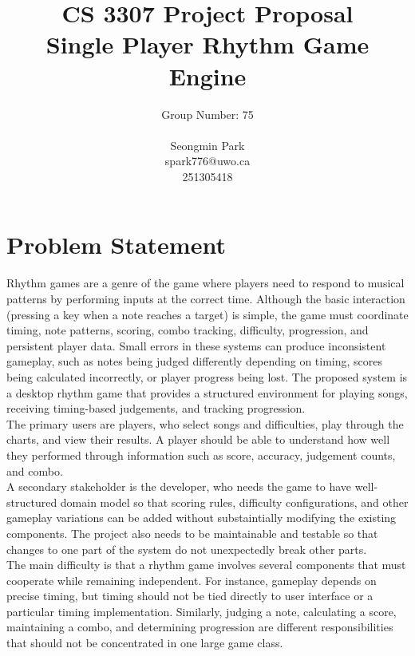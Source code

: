 \documentclass[12pt,a4paper]{article}
\title{
    CS 3307 Project Proposal \\ 
    \large Single Player Rhythm Game Engine
}
\author{
    Group Number: 75 \\
    \\
    Seongmin Park \\
    spark776@uwo.ca \\
    251305418
}
\date{}
\newcommand\tab[1][1cm]{\hspace*{#1}}
\begin{document}
\maketitle

\pagebreak

\section{Problem Statement}
\tab Rhythm games are a genre of the game where players need to respond to musical patterns by performing inputs at the correct time. 
Although the basic interaction (pressing a key when a note reaches a target)  is simple, the game must coordinate timing, note patterns, scoring, combo tracking, difficulty, progression, and persistent player data.
Small errors in these systems can produce inconsistent gameplay, such as notes being judged differently depending on timing, scores being calculated incorrectly, or player progress being lost.
The proposed system is a desktop rhythm game that provides a structured environment for playing songs, receiving timing-based judgements, and tracking progression. \\
\tab The primary users are players, who select songs and difficulties, play through the charts, and view their results.
A player should be able to understand how well they performed through information such as score, accuracy, judgement counts, and combo. \\
\tab A secondary stakeholder is the developer, who needs the game to have well-structured domain model so that scoring rules, difficulty configurations, and other gameplay variations can be added without substaintially modifying the existing components. 
The project also needs to be maintainable and testable so that changes to one part of the system do not unexpectedly break other parts. \\
\tab The main difficulty is that a rhythm game involves several components that must cooperate while remaining independent. For instance, gameplay depends on precise timing, but timing should not be tied directly to user interface or a particular timing implementation.
Similarly, judging a note, calculating a score, maintaining a combo, and determining progression are different responsibilities that should not be concentrated in one large game class.

\pagebreak
\end{document}
